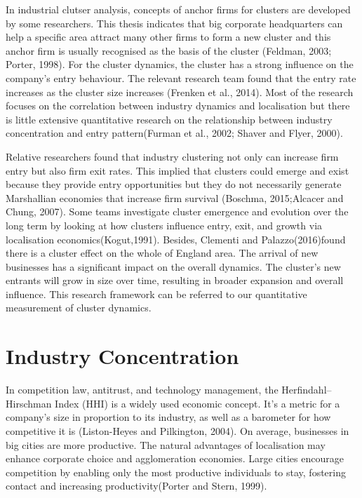 \documentclass[
  12pt,
  oneside]{book}
\begin{document}
In industrial clutser analysis, concepts of anchor firms for clusters are developed by some researchers. This thesis indicates that big corporate headquarters can help a specific area attract many other firms to form a new cluster and this anchor firm is usually recognised as the basis of the cluster (Feldman, 2003; Porter, 1998). For the cluster dynamics, the cluster has a strong influence on the company's entry behaviour. The relevant research team found that the entry rate increases as the cluster size increases (Frenken et al., 2014). Most of the research focuses on the correlation between industry dynamics and localisation but there is little extensive quantitative research on the relationship between industry concentration and entry pattern(Furman et al., 2002; Shaver and Flyer, 2000).

Relative researchers found that industry clustering not only can increase firm entry but also firm exit rates. This implied that clusters could emerge and exist because they provide entry opportunities but they do not necessarily generate Marshallian economies that increase firm survival (Boschma, 2015;Alcacer and Chung, 2007). Some teams investigate cluster emergence and evolution over the long term by looking at how clusters influence entry, exit, and growth via localisation economics(Kogut,1991). Besides, Clementi and Palazzo(2016)found there is a cluster effect on the whole of England area. The arrival of new businesses has a significant impact on the overall dynamics. The cluster's new entrants will grow in size over time, resulting in broader expansion and overall influence. This research framework can be referred to our quantitative measurement of cluster dynamics.

\hypertarget{industry-concentration}{%
\section{Industry Concentration}\label{industry-concentration}}

In competition law, antitrust, and technology management, the Herfindahl--Hirschman Index (HHI) is a widely used economic concept. It's a metric for a company's size in proportion to its industry, as well as a barometer for how competitive it is (Liston-Heyes and Pilkington, 2004). On average, businesses in big cities are more productive. The natural advantages of localisation may enhance corporate choice and agglomeration economies. Large cities encourage competition by enabling only the most productive individuals to stay, fostering contact and increasing productivity(Porter and Stern, 1999).
\end{document}
